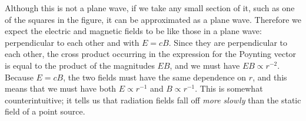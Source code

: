 Although this is not a plane wave, if we take any small section of it, such
as one of the squares in the figure, it can be approximated as a plane wave.
Therefore we expect the electric and magnetic fields to be like those in
a plane wave: perpendicular to each other and with $E=cB$.
Since they are perpendicular to each other, the cross product occurring
in the expression for the Poynting vector is equal to the product of the
magnitudes $EB$, and we must have $EB\propto r^{-2}$. Because $E=cB$, the
two fields must have the same dependence on $r$, and this means that we
must have both $E\propto r^{-1}$ and $B\propto r^{-1}$. This is somewhat
counterintuitive; it tells us that radiation fields fall off \emph{more
slowly} than the static field of a point source.
